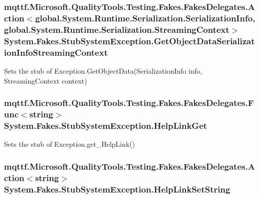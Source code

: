 \hypertarget{class_system_1_1_fakes_1_1_stub_system_exception_acd97218af4362f9c42da5e5d4b923496}{
\subsubsection[{Get\-Object\-Data\-Serialization\-Info\-Streaming\-Context}]{\setlength{\rightskip}{0pt plus 5cm}mqttf.\-Microsoft.\-Quality\-Tools.\-Testing.\-Fakes.\-Fakes\-Delegates.\-Action$<$global.\-System.\-Runtime.\-Serialization.\-Serialization\-Info, global.\-System.\-Runtime.\-Serialization.\-Streaming\-Context$>$ System.\-Fakes.\-Stub\-System\-Exception.\-Get\-Object\-Data\-Serialization\-Info\-Streaming\-Context}}\label{class_system_1_1_fakes_1_1_stub_system_exception_acd97218af4362f9c42da5e5d4b923496}


Sets the stub of Exception.\-Get\-Object\-Data(\-Serialization\-Info info, Streaming\-Context context)

\hypertarget{class_system_1_1_fakes_1_1_stub_system_exception_abbdb822c68244d57867d2e2831909b42}{
\subsubsection[{Help\-Link\-Get}]{\setlength{\rightskip}{0pt plus 5cm}mqttf.\-Microsoft.\-Quality\-Tools.\-Testing.\-Fakes.\-Fakes\-Delegates.\-Func$<$string$>$ System.\-Fakes.\-Stub\-System\-Exception.\-Help\-Link\-Get}}\label{class_system_1_1_fakes_1_1_stub_system_exception_abbdb822c68244d57867d2e2831909b42}


Sets the stub of Exception.\-get\-\_\-\-Help\-Link()

\hypertarget{class_system_1_1_fakes_1_1_stub_system_exception_a315605f2b0279a4b9732212a32de3ce2}{
\subsubsection[{Help\-Link\-Set\-String}]{\setlength{\rightskip}{0pt plus 5cm}mqttf.\-Microsoft.\-Quality\-Tools.\-Testing.\-Fakes.\-Fakes\-Delegates.\-Action$<$string$>$ System.\-Fakes.\-Stub\-System\-Exception.\-Help\-Link\-Set\-String}}\label{class_system_1_1_fakes_1_1_stub_system_exception_a315605f2b0279a4b9732212a32de3ce2}



